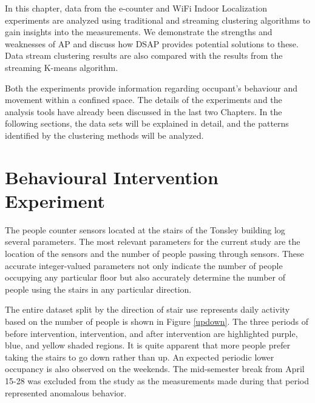 In this chapter, data from the e-counter and WiFi Indoor Localization experiments are analyzed using traditional and streaming clustering algorithms to gain insights into the measurements. We demonstrate the strengths and weaknesses of AP and discuss how DSAP provides potential solutions to these. Data stream clustering results are also compared with the results from the streaming K-means algorithm. 

Both the experiments provide information regarding occupant's behaviour and movement within a confined space. The details of the experiments and the analysis tools have already been discussed in the last two Chapters. In the following sections, the data sets will be explained in detail, and the patterns identified by the clustering methods will be analyzed.

 
\section{Behavioural Intervention Experiment} 


The people counter sensors located at the stairs of the Tonsley building log several parameters. The most relevant parameters for the current study are the location of the sensors and the number of people passing through sensors. These accurate integer-valued parameters not only indicate the number of people occupying any particular floor but also accurately determine the number of people using the stairs in any particular direction.

The entire dataset split by the direction of stair use represents daily activity based on the number of people is shown in Figure \ref{updown}. The three periods of before intervention, intervention, and after intervention are highlighted  purple, blue, and yellow shaded regions. It is quite apparent that more people prefer taking the stairs to go down rather than up. An expected periodic lower occupancy is also observed on the weekends. The mid-semester break from April 15-28 was excluded from the study as the measurements made during that period represented anomalous behavior.


